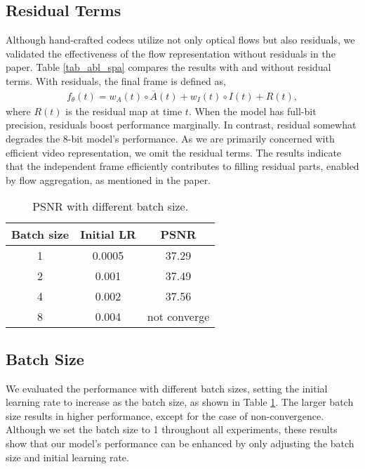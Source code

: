 \documentclass[sigconf]{acmart}
\begin{document}
\subsection{Residual Terms}
Although hand-crafted codecs utilize not only optical flows but also residuals, we validated the effectiveness of the flow representation without residuals in the paper.
Table \ref{tab_abl_spa} compares the results with and without residual terms.
With residuals, the final frame is defined as,
\begin{equation}
\label{eq_f}
\begin{gathered}
    f_\theta(t) = w_A(t) \circ \overline{A}(t) + w_I(t) \circ I(t) + R(t),
\end{gathered}
\end{equation}
where $R(t)$ is the residual map at time $t$.
When the model has full-bit precision, residuals boost performance marginally.
In contrast, residual somewhat degrades the 8-bit model's performance.
As we are primarily concerned with efficient video representation, we omit the residual terms.
The results indicate that the independent frame efficiently contributes to filling residual parts, enabled by flow aggregation, as mentioned in the paper.

\begin{table}[ht]
\centering
\caption{PSNR with different batch size.}
\vskip 0.15in
\begin{tabular}{c|c||c}
\hline
Batch size & Initial LR & PSNR  \\ \hline
1          & 0.0005     & 37.29 \\ \hline
2          & 0.001      & 37.49 \\ \hline
4          & 0.002      & 37.56 \\ \hline
8          & 0.004      & not converge\\ \hline
\end{tabular}
\label{tab_abl_bs}
\end{table}

\subsection{Batch Size}
We evaluated the performance with different batch sizes, setting the initial learning rate to increase as the batch size, as shown in Table \ref{tab_abl_bs}.
The larger batch size results in higher performance, except for the case of non-convergence.
Although we set the batch size to 1 throughout all experiments, these results show that our model's performance can be enhanced by only adjusting the batch size and initial learning rate.
\end{document}
